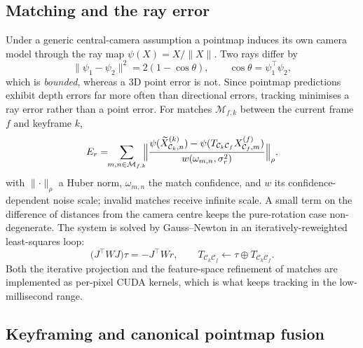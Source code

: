\subsection{Matching and the ray error}

Under a generic central-camera assumption a pointmap induces its own camera
model through the ray map $\psi(X)=X/\lVert X\rVert$. Two rays differ by
\begin{equation}
\lVert\psi_1-\psi_2\rVert^2 = 2(1-\cos\theta), \qquad \cos\theta=\psi_1^{\!\top}\psi_2,
\label{eq:rayangle}
\end{equation}
which is \emph{bounded}, whereas a 3D point error is not. Since pointmap
predictions exhibit depth errors far more often than directional errors,
tracking minimises a ray error rather than a point error. For matches
$\mathcal M_{f,k}$ between the current frame $f$ and keyframe $k$,
\begin{equation}
E_r=\!\!\sum_{m,n\in\mathcal M_{f,k}}\!\!
\Bigl\lVert
\frac{\psi(\widetilde X_{\mathcal C_k,n}^{(k)})
 -\psi(T_{\mathcal C_k\mathcal C_f}X_{\mathcal C_f,m}^{(f)})}
{w(\omega_{m,n},\sigma_r^2)}
\Bigr\rVert_\rho ,
\label{eq:trackray}
\end{equation}
with $\lVert\cdot\rVert_\rho$ a Huber norm, $\omega_{m,n}$ the match
confidence, and $w$ its confidence-dependent noise scale; invalid matches
receive infinite scale. A small term on the difference
of distances from the camera centre keeps the pure-rotation case
non-degenerate. The system is solved by Gauss--Newton in an
iteratively-reweighted least-squares loop:
\begin{equation}
\bigl(J^{\!\top}WJ\bigr)\tau=-J^{\!\top}Wr,\qquad
T_{\mathcal C_k\mathcal C_f}\leftarrow
\tau\oplus T_{\mathcal C_k\mathcal C_f}.
\label{eq:gn}
\end{equation}
Both the iterative projection and the feature-space refinement of matches are
implemented as per-pixel CUDA kernels, which is what keeps tracking in the
low-millisecond range.

\subsection{Keyframing and canonical pointmap fusion}

